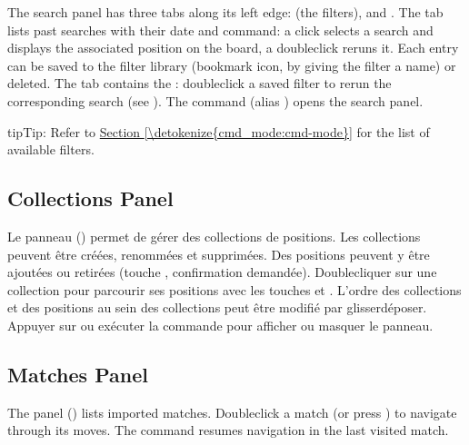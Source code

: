 \documentclass[letterpaper,10pt,english]{sphinxmanual}
\begin{document}
\sphinxAtStartPar
The search panel has three tabs along its left edge:  (the filters),  and . The  tab lists past searches with their date and command: a click selects a search and displays the associated position on the board, a double\sphinxhyphen{}click re\sphinxhyphen{}runs it. Each entry can be saved to the filter library (bookmark icon, by giving the filter a name) or deleted. The  tab contains the : double\sphinxhyphen{}click a saved filter to re\sphinxhyphen{}run the corresponding search (see {\hyperref[\detokenize{annexe_filtres:annexe-filtres}]{}}). The  command (alias ) opens the search panel.

\begin{sphinxadmonition}{tip}{Tip:}
\sphinxAtStartPar
Refer to \hyperref[\detokenize{cmd_mode:cmd-mode}]{Section \ref{\detokenize{cmd_mode:cmd-mode}}} for the list of available filters.
\end{sphinxadmonition}


\subsection{Collections Panel}
\label{\detokenize{manuel:panneau-collections}}\label{\detokenize{manuel:id6}}
\sphinxAtStartPar
Le panneau  () permet de gérer des collections de
positions. Les collections peuvent être créées, renommées et supprimées. Des
positions peuvent y être ajoutées ou retirées (touche , confirmation
demandée). Double\sphinxhyphen{}cliquer sur une collection pour parcourir ses positions
avec les touches  et . L’ordre des collections et des
positions au sein des collections peut être modifié par glisser\sphinxhyphen{}déposer.
Appuyer sur  ou exécuter la commande  pour afficher ou
masquer le panneau.


\subsection{Matches Panel}
\label{\detokenize{manuel:panneau-matchs}}\label{\detokenize{manuel:id7}}
\sphinxAtStartPar
The  panel () lists imported matches. Double\sphinxhyphen{}click a match (or press ) to navigate through its moves. The  command resumes navigation in the last visited match.
\end{document}
